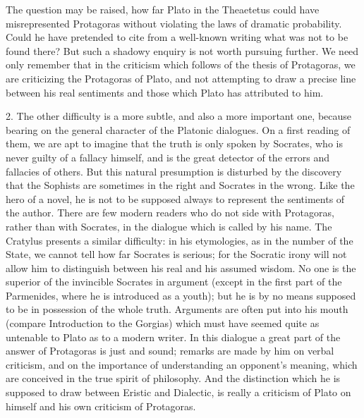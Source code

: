 The question may be raised, how far Plato in the Theaetetus could
have misrepresented Protagoras without violating the laws of dramatic
probability. Could he have pretended to cite from a well-known writing
what was not to be found there? But such a shadowy enquiry is not worth
pursuing further. We need only remember that in the criticism which
follows of the thesis of Protagoras, we are criticizing the Protagoras
of Plato, and not attempting to draw a precise line between his real
sentiments and those which Plato has attributed to him.

2. The other difficulty is a more subtle, and also a more important one,
because bearing on the general character of the Platonic dialogues. On
a first reading of them, we are apt to imagine that the truth is only
spoken by Socrates, who is never guilty of a fallacy himself, and is the
great detector of the errors and fallacies of others. But this natural
presumption is disturbed by the discovery that the Sophists are
sometimes in the right and Socrates in the wrong. Like the hero of a
novel, he is not to be supposed always to represent the sentiments
of the author. There are few modern readers who do not side with
Protagoras, rather than with Socrates, in the dialogue which is
called by his name. The Cratylus presents a similar difficulty: in
his etymologies, as in the number of the State, we cannot tell how
far Socrates is serious; for the Socratic irony will not allow him
to distinguish between his real and his assumed wisdom. No one is the
superior of the invincible Socrates in argument (except in the first
part of the Parmenides, where he is introduced as a youth); but he is by
no means supposed to be in possession of the whole truth. Arguments are
often put into his mouth (compare Introduction to the Gorgias) which
must have seemed quite as untenable to Plato as to a modern writer.
In this dialogue a great part of the answer of Protagoras is just
and sound; remarks are made by him on verbal criticism, and on the
importance of understanding an opponent's meaning, which are conceived
in the true spirit of philosophy. And the distinction which he is
supposed to draw between Eristic and Dialectic, is really a criticism of
Plato on himself and his own criticism of Protagoras.

